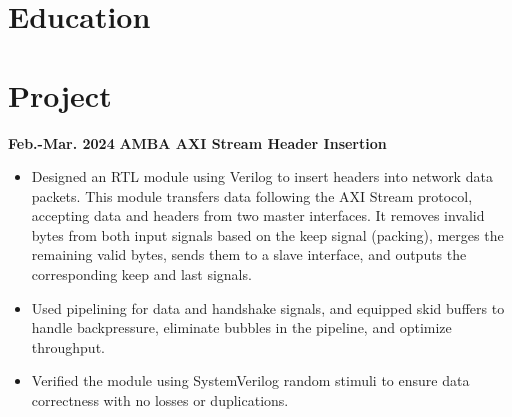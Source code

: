 \documentclass[11pt,a4paper,sans]{moderncv}
\begin{document}
\makecvtitle
\vspace{-1.5cm} 

\section{Education}

\vspace{-0.5cm} 
\section{Project}

\cventry
{\textnormal{\textbf{Feb.-Mar. 2024}}}
{\textnormal{\textbf{AMBA AXI Stream Header Insertion}}}
{}{}{}
{
    \begin{itemize}
        \item Designed an RTL module using Verilog to insert headers into network data packets. This module transfers data following the AXI Stream protocol, accepting data and headers from two master interfaces. It removes invalid bytes from both input signals based on the keep signal (packing), merges the remaining valid bytes, sends them to a slave interface, and outputs the corresponding keep and last signals.
        \item Used pipelining for data and handshake signals, and equipped skid buffers to handle backpressure, eliminate bubbles in the pipeline, and optimize throughput.
        \item Verified the module using SystemVerilog random stimuli to ensure data correctness with no losses or duplications.
    \end{itemize}
}
\end{document}
